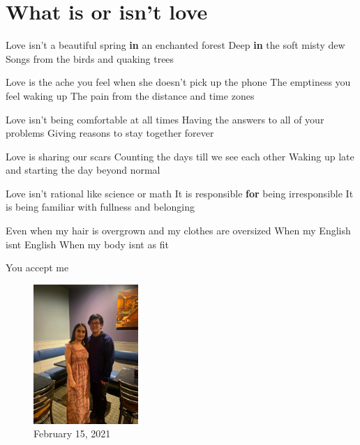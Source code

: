 \documentclass[
]{book}
\newenvironment{Shaded}{\begin{snugshade}}{\end{snugshade}}
\newcommand{\ControlFlowTok}[1]{\textcolor[rgb]{0.13,0.29,0.53}{\textbf{#1}}}
\newcommand{\NormalTok}[1]{#1}
\newcommand{\StringTok}[1]{\textcolor[rgb]{0.31,0.60,0.02}{#1}}
\begin{document}
\hypertarget{what-is-or-isnt-love}{%
\chapter{What is or isn't love}\label{what-is-or-isnt-love}}

\begin{Shaded}
\begin{Highlighting}[]

\NormalTok{Love isn’t a beautiful spring }\ControlFlowTok{in}\NormalTok{ an enchanted forest}
\NormalTok{Deep }\ControlFlowTok{in}\NormalTok{ the soft misty dew}
\NormalTok{Songs from the birds and quaking trees}

\NormalTok{Love is the ache you feel when she doesn’t pick up the phone}
\NormalTok{The emptiness you feel waking up}
\NormalTok{The pain from the distance and time zones}

\NormalTok{Love isn’t being comfortable at all times}
\NormalTok{Having the answers to all of your problems}
\NormalTok{Giving reasons to stay together forever}

\NormalTok{Love is sharing our scars}
\NormalTok{Counting the days till we see each other}
\NormalTok{Waking up late and starting the day beyond normal}

\NormalTok{Love isn’t rational like science or math}
\NormalTok{It is responsible }\ControlFlowTok{for}\NormalTok{ being irresponsible }
\NormalTok{It is being familiar with fullness and belonging}

\NormalTok{Even when my hair is overgrown and my clothes are oversized}
\NormalTok{When my English isn}\StringTok{\textquotesingle{}t English }
\StringTok{When my body isn\textquotesingle{}}\NormalTok{t as fit}

\NormalTok{You accept me}
\end{Highlighting}
\end{Shaded}

\begin{figure}
\centering
\includegraphics[width=1.5625in,height=\textheight]{mimages/16 2-16-2021.jpg}
\caption{February 15, 2021}
\end{figure}
\end{document}
